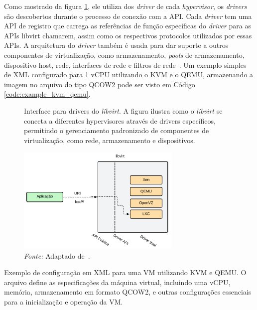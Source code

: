 Como mostrado da figura \ref*{fig:libvirt_interface}, ele utiliza dos \textit{driver} de cada \textit{hypervisor}, os \textit{drivers} são descobertos durante o processo de conexão com a API. Cada \textit{driver} tem uma API de registro que carrega as referências de função específicas do \textit{driver} para as APIs libvirt chamarem, assim como os respectivos protocolos utilizados por essas APIs. A arquitetura do \textit{driver} também é usada para dar suporte a outros componentes de virtualização, como armazenamento, \textit{pools} de armazenamento, dispositivo host, rede, interfaces de rede e filtros de rede~\citep{LibvirtDocumentation}. Um exemplo simples de XML configurado para 1 vCPU utilizando o KVM e o QEMU, armazenando a imagem no arquivo do tipo QCOW2 pode ser visto em Código \ref{code:example_kvm_qemu}.


\begin{figure}[htbp]
  \centering
  \caption{Interface para drivers do \textit{libvirt}. A figura ilustra como o \textit{libvirt} se conecta a diferentes hypervisores através de drivers específicos, permitindo o gerenciamento padronizado de componentes de virtualização, como rede, armazenamento e dispositivos.}
  \includegraphics[width=0.7\textwidth]{images/libvirt_interface.png}
  \caption*{\textit{Fonte:} Adaptado de~\citep{LibvirtDocumentation}.}
  \label{fig:libvirt_interface}
\end{figure}

\begin{listing}[h!]
  \noindent{}  
\caption{Exemplo de configuração em XML para uma VM utilizando KVM e QEMU. O arquivo define as especificações da máquina virtual, incluindo uma vCPU, memória, armazenamento em formato QCOW2, e outras configurações essenciais para a inicialização e operação da VM.}
\label{code:example_kvm_qemu}
\end{listing}


